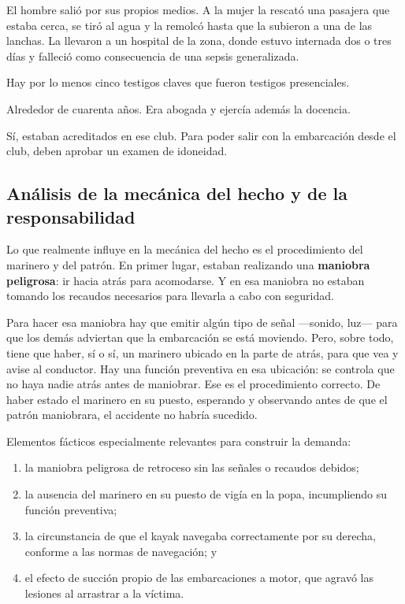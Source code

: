 \documentclass[12pt,oneside]{book}
\begin{document}
\begin{description}[leftmargin=1.2em,style=nextline]
    \item[¿A qué hospital fueron trasladados?] El hombre salió por sus propios medios. A la mujer la rescató una pasajera que estaba cerca, se tiró al agua y la remolcó hasta que la subieron a una de las lanchas. La llevaron a un hospital de la zona, donde estuvo internada dos o tres días y falleció como consecuencia de una sepsis generalizada.
    \item[¿Cuántos testigos hay?] Hay por lo menos cinco testigos claves que fueron testigos presenciales.
    \item[¿Qué edad tenía la mujer fallecida y a qué se dedicaba?] Alrededor de cuarenta años. Era abogada y ejercía además la docencia.
    \item[¿Estaban federados los remeros, tenían la habilitación correspondiente del club?] Sí, estaban acreditados en ese club. Para poder salir con la embarcación desde el club, deben aprobar un examen de idoneidad.
\end{description}

\subsection{Análisis de la mecánica del hecho y de la responsabilidad}

Lo que realmente influye en la mecánica del hecho es el procedimiento del marinero y del patrón. En primer lugar, estaban realizando una \textbf{maniobra peligrosa}: ir hacia atrás para acomodarse. Y en esa maniobra no estaban tomando los recaudos necesarios para llevarla a cabo con seguridad.

Para hacer esa maniobra hay que emitir algún tipo de señal ---sonido, luz--- para que los demás adviertan que la embarcación se está moviendo. Pero, sobre todo, tiene que haber, sí o sí, un marinero ubicado en la parte de atrás, para que vea y avise al conductor. Hay una función preventiva en esa ubicación: se controla que no haya nadie atrás antes de maniobrar. Ese es el procedimiento correcto. De haber estado el marinero en su puesto, esperando y observando antes de que el patrón maniobrara, el accidente no habría sucedido.

\begin{important}
Elementos fácticos especialmente relevantes para construir la demanda:
\begin{enumerate}[label=(\roman*)]
    \item la maniobra peligrosa de retroceso sin las señales o recaudos debidos;
    \item la ausencia del marinero en su puesto de vigía en la popa, incumpliendo su función preventiva;
    \item la circunstancia de que el kayak navegaba correctamente por su derecha, conforme a las normas de navegación; y
    \item el efecto de succión propio de las embarcaciones a motor, que agravó las lesiones al arrastrar a la víctima.
\end{enumerate}
\end{important}
\end{document}

